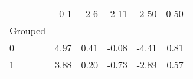 \begin{tabular}{lrrrrr}
\toprule
{} &   0-1 &   2-6 &  2-11 &  2-50 &  0-50 \\
Grouped &       &       &       &       &       \\
\midrule
0       &  4.97 &  0.41 & -0.08 & -4.41 &  0.81 \\
1       &  3.88 &  0.20 & -0.73 & -2.89 &  0.57 \\
\bottomrule
\end{tabular}

